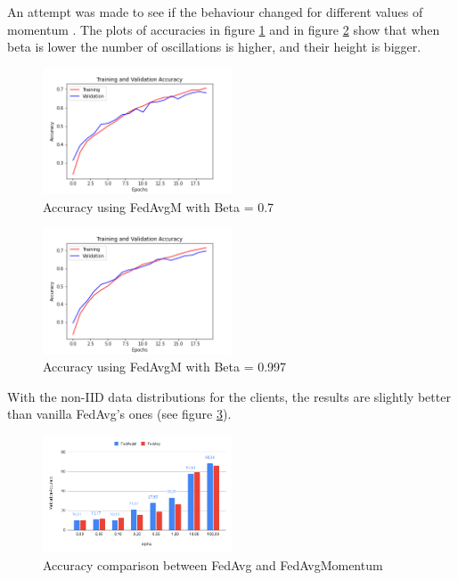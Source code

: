 \documentclass[twocolumn]{article}
\begin{document}
An attempt was made to see if the behaviour changed for different values of momentum . The plots of accuracies in figure \ref{AccFedAvgB0.7} and in figure \ref{AccFedAvgB0.997} show that when beta is lower the number of oscillations is higher, and their height is bigger.
\begin{figure}
    \centering
    \includegraphics[width=0.5\textwidth,height=.3\textheight]{5_AccuracyFedAvgM_Beta0.7.png}
    \caption{Accuracy using FedAvgM with Beta = 0.7}
     \label{AccFedAvgB0.7} 
\end{figure}

\begin{figure}
    \centering
    \includegraphics[width=0.5\textwidth,height=.3\textheight]{5_AccuracyFedAvgM_Beta0.997.png}
    \caption{Accuracy using FedAvgM with Beta = 0.997}
     \label{AccFedAvgB0.997} 
\end{figure}

With the non-IID data distributions for the clients, the results are slightly better than vanilla FedAvg's ones (see figure \ref{FedAvgvsFedM}). 

\begin{figure}
    \centering
    \includegraphics[width=0.5\textwidth,height=.3\textheight]{FedAvgMvsFedAvg.png}
    \caption{Accuracy comparison between FedAvg and FedAvgMomentum}
    \label{FedAvgvsFedM} 
\end{figure}
\end{document}
